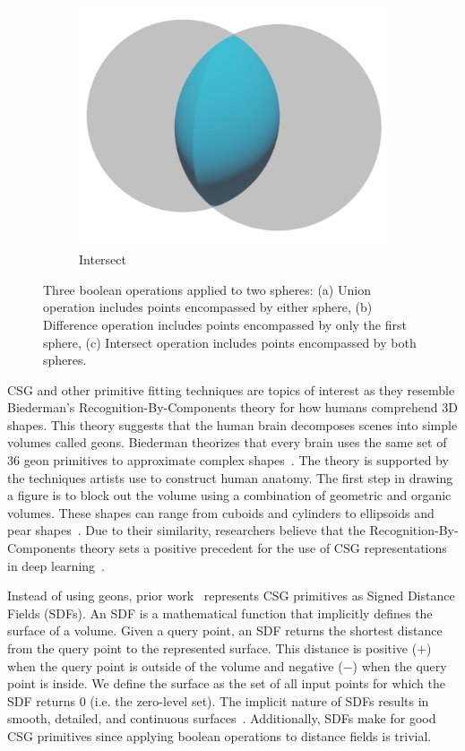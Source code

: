 \begin{figure}
\begin{subfigure}[t]{0.3\textwidth}
		\includegraphics[width=\textwidth]{Images/Intersect}
		\caption{Intersect}
	\end{subfigure}
	\caption{Three boolean operations applied to two spheres: (a) Union operation includes points encompassed by either sphere, (b) Difference operation includes points encompassed by only the first sphere, (c) Intersect operation includes points encompassed by both spheres.}
	\label{fig:boolean operations}
\end{figure}

CSG and other primitive fitting techniques are topics of interest as they resemble Biederman's Recognition-By-Components theory for how humans comprehend 3D shapes. This theory suggests that the human brain decomposes scenes into simple volumes called geons. Biederman theorizes that every brain uses the same set of 36 geon primitives to approximate complex shapes~\cite{Biederman1987}. The theory is supported by the techniques artists use to construct human anatomy. The first step in drawing a figure is to block out the volume using a combination of geometric and organic volumes. These shapes can range from cuboids and cylinders to ellipsoids and pear shapes~\cite{Winslow2015}. Due to their similarity, researchers believe that the Recognition-By-Components theory sets a positive precedent for the use of CSG representations in deep learning~\cite{Sharma2018}.

Instead of using geons, prior work~\cite{Sharma2018, Kania2020, Ren2021} represents CSG primitives as Signed Distance Fields (SDFs). An SDF is a mathematical function that implicitly defines the surface of a volume. Given a query point, an SDF returns the shortest distance from the query point to the represented surface. This distance is positive ($+$) when the query point is outside of the volume and negative ($-$) when the query point is inside. We define the surface as the set of all input points for which the SDF returns 0 (i.e. the zero-level set). The implicit nature of SDFs results in smooth, detailed, and continuous surfaces~\cite{Park2019}. Additionally, SDFs make for good CSG primitives since applying boolean operations to distance fields is trivial.

